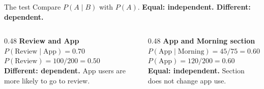 \documentclass[aspectratio=169, 11pt]{beamer}
\newcommand{\redink}[1]{{\color{redacc}\bfseries #1}}
\begin{document}
\begin{frame}[t, plain]
  \begin{block}{The test}
    Compare $P(A \mid B)$ with $P(A)$. \textbf{Equal: independent. Different: dependent.}
  \end{block}
  \vspace{4pt}
  \begin{columns}[t]
    \begin{column}{0.48\textwidth}
      \textbf{Review and App}\\[3pt]
      $P(\text{Review} \mid \text{App}) = 0.70$\\
      $P(\text{Review}) = 100/200 = 0.50$\\[3pt]
      \redink{Different: dependent.} App users are more likely to go to review.
    \end{column}
    \begin{column}{0.48\textwidth}
      \textbf{App and Morning section}\\[3pt]
      $P(\text{App} \mid \text{Morning}) = 45/75 = 0.60$\\
      $P(\text{App}) = 120/200 = 0.60$\\[3pt]
      \redink{Equal: independent.} Section does not change app use.
    \end{column}
  \end{columns}
\end{frame}
\end{document}
